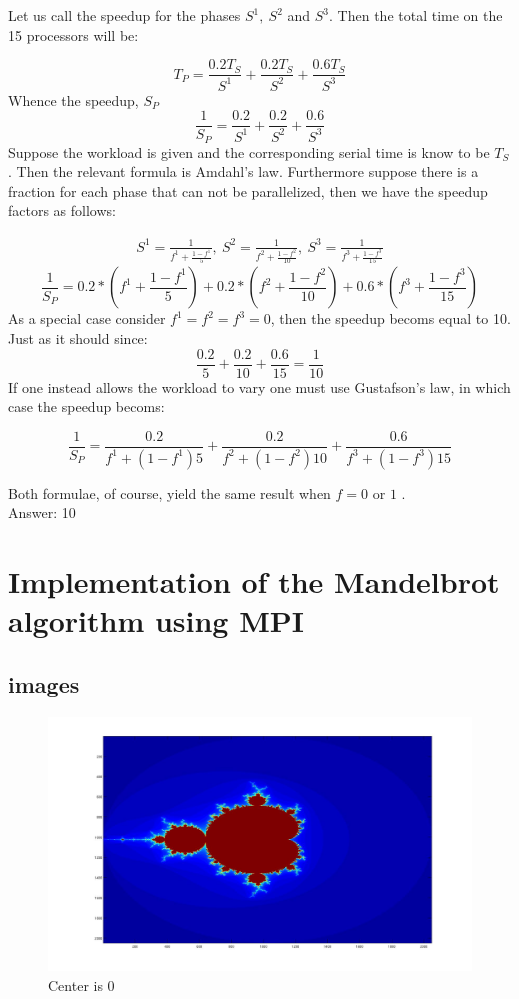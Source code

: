 \noindent
Let us call the speedup for the phases $S^1,\ S^2 $ and $S^3$. Then the total time on the 15 processors will be:

\[T_P = \frac{0.2T_S}{S^1}+\frac{0.2T_S}{S^2}+\frac{0.6T_S}{S^3}   \]
Whence the speedup, $S_P$
\[\frac{1}{S_P}  =\frac{0.2}{S^1}+\frac{0.2}{S^2}+\frac{0.6}{S^3} \]
Suppose the workload is given and the corresponding serial time is know to be $T_S$. Then the relevant formula is Amdahl's law. Furthermore suppose there is a fraction for each phase that can not be parallelized, then we have the speedup factors as follows:

\begin{gather*}
S^1 = \frac{1}{f^1+\frac{1-f^1}{5}}, \ S^2 = \frac{1}{f^2+\frac{1-f^2}{10}}, \ S^3 = \frac{1}{f^3+\frac{1-f^3}{15}}
\end{gather*}
\[\frac{1}{S_P} = 0.2*(f^1+\frac{1-f^1}{5})+0.2*(f^2+\frac{1-f^2}{10}) +0.6*(f^3+\frac{1-f^3}{15})   \]
As a special case consider $f^1=f^2=f^3 = 0$, then the speedup becoms equal to 10. Just as it should since:
\[\frac{0.2}{5}+\frac{0.2}{10}+\frac{0.6}{15} =\frac{1}{10} \]
If one instead allows the workload to vary one must use Gustafson's law, in which case the speedup becoms:

\[\frac{1}{S_P} = \frac{0.2}{f^1+(1-f^1)5}+\frac{0.2}{f^2+(1-f^2)10}+\frac{0.6}{f^3+(1-f^3)15} \]

Both formulae, of course, yield the same result when $f=0$ or $1$ .\\
Answer: 10
\section{Implementation of the Mandelbrot algorithm using MPI}

\subsection{images}

\begin{figure}[H]
\centering
\includegraphics[width=1\textwidth]{img/mandelb.jpg}
\caption{Center is 0}
\end{figure}

